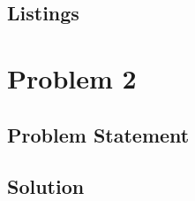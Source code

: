 \documentclass[12pt,a4paper,titlepage,oneside]{article}
\begin{document}
\subsection{Listings}


\newpage
\section{Problem 2}

\subsection{Problem Statement}


\subsection{Solution}
\end{document}
